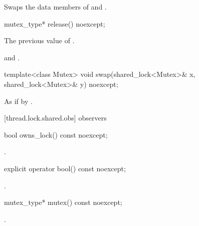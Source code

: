 \begin{itemdescr}
\pnum
\effects Swaps the data members of  and .
\end{itemdescr}

%
\begin{itemdecl}
mutex_type* release() noexcept;
\end{itemdecl}

\begin{itemdescr}
\pnum
\returns The previous value of .

\pnum
\postconditions {} and .
\end{itemdescr}

%
\begin{itemdecl}
template<class Mutex>
  void swap(shared_lock<Mutex>& x, shared_lock<Mutex>& y) noexcept;
\end{itemdecl}

\begin{itemdescr}
\pnum
\effects As if by .
\end{itemdescr}

[thread.lock.shared.obs]{ observers}

%
\begin{itemdecl}
bool owns_lock() const noexcept;
\end{itemdecl}

\begin{itemdescr}
\pnum
\returns {}.
\end{itemdescr}

%
\begin{itemdecl}
explicit operator bool() const noexcept;
\end{itemdecl}

\begin{itemdescr}
\pnum
\returns {}.
\end{itemdescr}

%
\begin{itemdecl}
mutex_type* mutex() const noexcept;
\end{itemdecl}

\begin{itemdescr}
\pnum
\returns {}.
\end{itemdescr}

